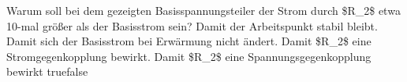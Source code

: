     {Warum soll bei dem gezeigten Basisspannungsteiler der Strom durch \$R\_2\$ etwa 10-mal größer als der Basisstrom sein?}
    {Damit der Arbeitspunkt stabil bleibt.}
    {Damit sich der Basisstrom bei Erwärmung nicht ändert.}
    {Damit \$R\_2\$ eine Stromgegenkopplung bewirkt.}
    {Damit \$R\_2\$ eine Spannungsgegenkopplung bewirkt}
    {true}{false}